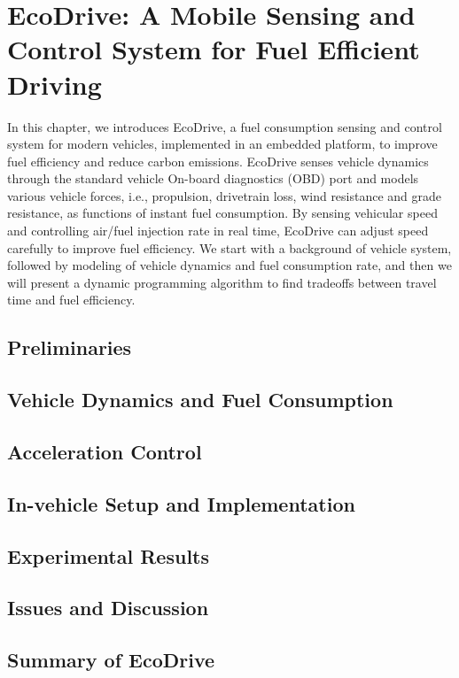 
\chapter{EcoDrive: A Mobile Sensing and Control System for Fuel Efficient Driving}
\label{chapter_ecodrive}

In this chapter, we introduces EcoDrive, 
a fuel consumption sensing and control system for modern vehicles, implemented
in an embedded platform, to improve fuel efficiency and reduce carbon emissions. 
EcoDrive senses vehicle dynamics
through the standard vehicle On-board diagnostics (OBD)
port and models various vehicle forces, i.e., propulsion, drivetrain loss, 
wind resistance and grade resistance, as functions of instant fuel consumption. 
By sensing vehicular speed and
controlling air/fuel injection rate in real time, EcoDrive can
adjust speed carefully to improve fuel efficiency.
We start with a background of vehicle system, followed by modeling
of vehicle dynamics and fuel consumption rate, and
then we will present a dynamic programming algorithm
to find tradeoffs between travel time and fuel efficiency. 

\section{Preliminaries}




\section{Vehicle Dynamics and Fuel Consumption}






\section{Acceleration Control}




\section{In-vehicle Setup and Implementation}




\section{Experimental Results}



\section{Issues and Discussion}




\section{Summary of EcoDrive}




